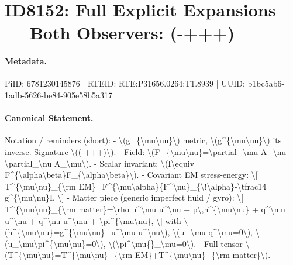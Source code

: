 \section*{ID8152: Full Explicit Expansions — Both Observers: (-+++)}
\paragraph{Metadata.}
PiID: 6781230145876 | RTEID: RTE:P31656.0264:T1.8939 | UUID: b1bc5ab6-1adb-5626-be84-905e58b5a317

\paragraph{Canonical Statement.}
Notation / reminders (short): - \textbackslash{}(g\_\{\textbackslash{}mu\textbackslash{}nu\}\textbackslash{}) metric, \textbackslash{}(g\textasciicircum{}\{\textbackslash{}mu\textbackslash{}nu\}\textbackslash{}) its inverse. Signature \textbackslash{}((-+++)\textbackslash{}). - Field: \textbackslash{}(F\_\{\textbackslash{}mu\textbackslash{}nu\}=\textbackslash{}partial\_\textbackslash{}mu A\_\textbackslash{}nu-\textbackslash{}partial\_\textbackslash{}nu A\_\textbackslash{}mu\textbackslash{}). - Scalar invariant: \textbackslash{}(I\textbackslash{}equiv F\textasciicircum{}\{\textbackslash{}alpha\textbackslash{}beta\}F\_\{\textbackslash{}alpha\textbackslash{}beta\}\textbackslash{}). - Covariant EM stress-energy: \textbackslash{}[ T\textasciicircum{}\{\textbackslash{}mu\textbackslash{}nu\}\_\{\textbackslash{}rm EM\}=F\textasciicircum{}\{\textbackslash{}mu\textbackslash{}alpha\}\{F\textasciicircum{}\textbackslash{}nu\}\_\{\textbackslash{}!\textbackslash{}alpha\}-\textbackslash{}tfrac14 g\textasciicircum{}\{\textbackslash{}mu\textbackslash{}nu\}I. \textbackslash{}] - Matter piece (generic imperfect fluid / gyro): \textbackslash{}[ T\textasciicircum{}\{\textbackslash{}mu\textbackslash{}nu\}\_\{\textbackslash{}rm matter\}=\textbackslash{}rho u\textasciicircum{}\textbackslash{}mu u\textasciicircum{}\textbackslash{}nu + p\textbackslash{},h\textasciicircum{}\{\textbackslash{}mu\textbackslash{}nu\} + q\textasciicircum{}\textbackslash{}mu u\textasciicircum{}\textbackslash{}nu + q\textasciicircum{}\textbackslash{}nu u\textasciicircum{}\textbackslash{}mu + \textbackslash{}pi\textasciicircum{}\{\textbackslash{}mu\textbackslash{}nu\}, \textbackslash{}] with \textbackslash{}(h\textasciicircum{}\{\textbackslash{}mu\textbackslash{}nu\}=g\textasciicircum{}\{\textbackslash{}mu\textbackslash{}nu\}+u\textasciicircum{}\textbackslash{}mu u\textasciicircum{}\textbackslash{}nu\textbackslash{}), \textbackslash{}(u\_\textbackslash{}mu q\textasciicircum{}\textbackslash{}mu=0\textbackslash{}), \textbackslash{}(u\_\textbackslash{}mu\textbackslash{}pi\textasciicircum{}\{\textbackslash{}mu\textbackslash{}nu\}=0\textbackslash{}), \textbackslash{}(\textbackslash{}pi\textasciicircum{}\textbackslash{}mu\{\}\_\textbackslash{}mu=0\textbackslash{}). - Full tensor \textbackslash{}(T\textasciicircum{}\{\textbackslash{}mu\textbackslash{}nu\}=T\textasciicircum{}\{\textbackslash{}mu\textbackslash{}nu\}\_\{\textbackslash{}rm EM\}+T\textasciicircum{}\{\textbackslash{}mu\textbackslash{}nu\}\_\{\textbackslash{}rm matter\}\textbackslash{}).

